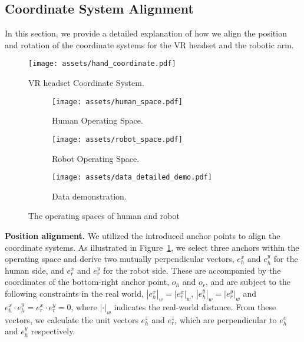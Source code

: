 \subsection{Coordinate System Alignment}
\label{sec:alignmet}
In this section, we provide a detailed explanation of how we align the position and rotation of the coordinate systems for the VR headset and the robotic arm.
\begin{figure}[h]
\centering
\texttt{[image: assets/hand\_coordinate.pdf]}
\vspace{-0.5em}
\caption{VR headset Coordinate System.}
\label{fig:pipeline:alignment}
\vspace{-0.5em}
\end{figure}

\begin{figure*}[t]
    \centering
    \begin{subfigure}{0.4\textwidth}
        \centering
        \texttt{[image: assets/human\_space.pdf]}
        \caption{Human Operating Space.}
        \label{fig:human_operating_space}
    \end{subfigure}
    \hspace{0.1cm}
    \begin{subfigure}{0.4\textwidth}
        \centering
        \texttt{[image: assets/robot\_space.pdf]}
        \caption{Robot Operating Space.}
        \label{fig:robot_operating_space}
    \end{subfigure}
    \begin{subfigure}{0.9\textwidth}
        \centering
        \texttt{[image: assets/data\_detailed\_demo.pdf]}
        \caption{Data demonstration.}
        \label{fig:data_detailed_demo}
    \end{subfigure}
\caption{The operating spaces of human and robot}
\label{fig:operating_space}
\end{figure*}

\vspace{-0.3cm}
\noindent\textbf{Position alignment.}
\label{para:position}
We utilized the introduced anchor points to align the coordinate systems. As illustrated in Figure~\ref{fig:pipeline:alignment}, we select three anchors within the operating space and derive two mutually perpendicular vectors, $e_h^x$ and $e_h^y$ for the human side, and $e_r^x$ and $e_r^y$ for the robot side. These are accompanied by the coordinates of the bottom-right anchor point, $o_h$ and $o_r$, and are subject to the following constraints in the real world, $|e_h^x|_w=|e_r^x|_w$, $|e_h^y|_w=|e_r^y|_w$ and $ e_h^x \cdot e_h^y = e_r^x \cdot e_r^y = 0$, where $|\cdot|_w$ indicates the real-world distance. From these vectors, we calculate the unit vectors $e_h^z$ and $e_r^z$, which are perpendicular to $e_h^x$ and $e_h^y$ respectively.

